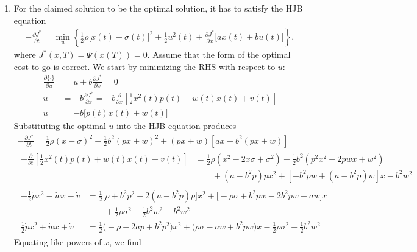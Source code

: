 \documentclass[letterpaper,11pt,titlepage]{article}
\newcommand*\pder[2]{\frac{\partial #1}{\partial #2}}
\begin{document}
\begin{enumerate}[leftmargin=0pt]
    \item For the claimed solution to be the optimal solution, it has to satisfy the HJB equation
        \begin{gather}
            -\pder{J^*}{t} = \min_u \left\{ \frac12 \rho\big[x(t)-\sigma(t)\big]^2 + \frac12 u^2(t) + \pder{J^*}{x} \big[ax(t) + bu(t)\big] \right\},
        \end{gather}
        where $J^*(x,T)=\Psi(x(T))=0$. Assume that the form of the optimal cost-to-go is correct. We start by minimizing the RHS with respect to $u$:
        \begin{align}
            \pder{\{\cdot\}}{u} &= u + b\pder{J^*}{x} = 0 \\
            u &= -b \pder{J^*}{x} = -b \pder{}{x} \left[ \frac12 x^2(t) p(t) + w(t) x(t) + v(t) \right] \\
            u &= -b \big[ p(t) x(t) + w(t) \big] \label{eq:p2_u}
        \end{align}
        Substituting the optimal $u$ into the HJB equation produces
        \begin{gather}
            -\pder{J^*}{t} = \frac12 \rho (x-\sigma)^2 + \frac12 b^2 (px+w)^2 + (px+w)[ax-b^2(px+w)] \\
            \begin{aligned}
                -\pder{}{t}\left[ \frac12 x^2(t) p(t) + w(t) x(t) + v(t) \right] &= \frac12 \rho (x^2-2x\sigma+\sigma^2) + \frac12 b^2(p^2x^2 + 2pwx + w^2) \\
                                                                                 & \qquad {} + (a-b^2p)px^2 + [-b^2pw+(a-b^2p)w]x - b^2w^2
            \end{aligned} \\
            \begin{aligned}
                - \frac12 \dot p x^2 - \dot w x - \dot v &= \frac12 \Big[\rho+b^2p^2+2(a-b^2p)p\Big] x^2 + \Big[-\rho\sigma + b^2pw - 2b^2pw + aw\Big] x \\
                                                         & \qquad {} + \frac12 \rho\sigma^2 + \frac12 b^2w^2 - b^2w^2 \\
                \frac12 \dot p x^2 + \dot w x + \dot v &= \frac12 \Big(-\rho -2ap +b^2p^2\Big) x^2 + \Big(\rho\sigma - aw + b^2pw \Big) x - \frac12 \rho\sigma^2 + \frac12 b^2w^2
            \end{aligned}
        \end{gather}
        Equating like powers of $x$, we find
        \begin{align}

\end{align}
\end{enumerate}
\end{document}
